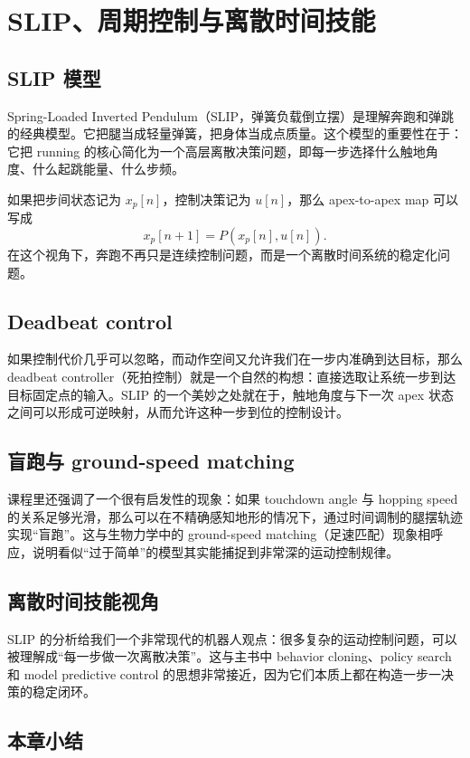 \documentclass[a4paper]{article}
\begin{document}
\section{SLIP、周期控制与离散时间技能}

\subsection{SLIP 模型}

Spring-Loaded Inverted Pendulum（SLIP，弹簧负载倒立摆）是理解奔跑和弹跳的经典模型。它把腿当成轻量弹簧，把身体当成点质量。这个模型的重要性在于：它把 running 的核心简化为一个高层离散决策问题，即每一步选择什么触地角度、什么起跳能量、什么步频。

如果把步间状态记为 $x_p[n]$，控制决策记为 $u[n]$，那么 apex-to-apex map 可以写成
\[
x_p[n+1] = P(x_p[n],u[n]).
\]
在这个视角下，奔跑不再只是连续控制问题，而是一个离散时间系统的稳定化问题。

\subsection{Deadbeat control}

如果控制代价几乎可以忽略，而动作空间又允许我们在一步内准确到达目标，那么 deadbeat controller（死拍控制）就是一个自然的构想：直接选取让系统一步到达目标固定点的输入。SLIP 的一个美妙之处就在于，触地角度与下一次 apex 状态之间可以形成可逆映射，从而允许这种一步到位的控制设计。

\subsection{盲跑与 ground-speed matching}

课程里还强调了一个很有启发性的现象：如果 touchdown angle 与 hopping speed 的关系足够光滑，那么可以在不精确感知地形的情况下，通过时间调制的腿摆轨迹实现“盲跑”。这与生物力学中的 ground-speed matching（足速匹配）现象相呼应，说明看似“过于简单”的模型其实能捕捉到非常深的运动控制规律。

\subsection{离散时间技能视角}

SLIP 的分析给我们一个非常现代的机器人观点：很多复杂的运动控制问题，可以被理解成“每一步做一次离散决策”。这与主书中 behavior cloning、policy search 和 model predictive control 的思想非常接近，因为它们本质上都在构造一步一决策的稳定闭环。

\subsection{本章小结}
\end{document}
